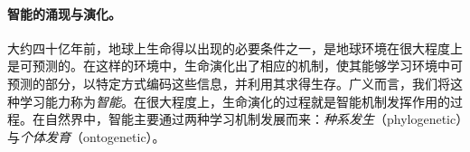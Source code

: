 \documentclass[../../book-main_zh.tex]{subfiles}
\begin{document}
\paragraph{智能的涌现与演化。}
    

大约四十亿年前，地球上生命得以出现的必要条件之一，是地球环境在很大程度上是可预测的。在这样的环境中，生命演化出了相应的机制，使其能够学习环境中可预测的部分，以特定方式编码这些信息，并利用其求得生存。广义而言，我们将这种学习能力称为{\em 智能}。在很大程度上，生命演化的过程就是智能机制发挥作用的过程。在自然界中，智能主要通过两种学习机制发展而来：{\em 种系发生}（phylogenetic）与{\em 个体发育}（ontogenetic）\cite{Wiener-Cybernetics-1961}。%
\end{document}
